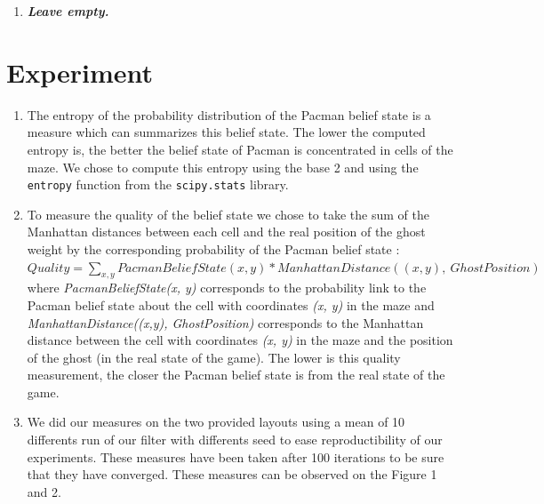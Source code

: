 \documentclass{article}
\begin{document}
\begin{enumerate}[label=\alph*.,leftmargin=*]
    \item \textbf{\textit{Leave empty.}}
\end{enumerate}

\section{Experiment}

\begin{enumerate}[label=\alph*.,leftmargin=*]
    \item The entropy of the probability distribution of the Pacman belief state is a measure which can summarizes this belief state. 
    The lower the computed entropy is, the better the belief state of Pacman is concentrated in cells of the maze. We chose to compute this entropy using the base 2 and using the \texttt{entropy} function from the \texttt{scipy.stats} library.
    \item To measure the quality of the belief state we chose to take the sum of the Manhattan distances between each cell and the real position of the ghost weight by the corresponding probability of the Pacman belief state :\\
    
    $Quality = {\sum_{x, y} {PacmanBeliefState(x, y) * ManhattanDistance((x, y), \ GhostPosition)}}$\\

    where \textit{PacmanBeliefState(x, y)} corresponds to the probability link to the Pacman belief state about the cell with coordinates \textit{(x, y)} in the maze and \textit{ManhattanDistance((x,y), GhostPosition)} corresponds
    to the Manhattan distance between the cell with coordinates \textit{(x, y)} in the maze and the position of the ghost (in the real state of the game). The lower is this quality measurement, the closer the Pacman belief state is from the real state of the game.
    \item We did our measures on the two provided layouts using a mean of 10 differents run of our filter with differents seed to ease reproductibility of our experiments. These measures have been taken after 100 iterations to be sure that they have converged.
    These measures can be observed on the Figure 1 and 2. 


\end{enumerate}
\end{document}
